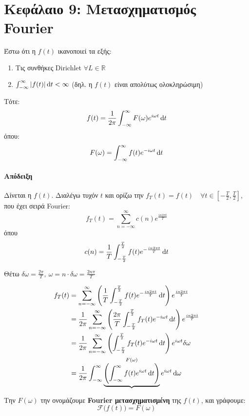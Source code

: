 \documentclass[11pt,a4paper,titlepage,draft]{article}
\begin{document}
\section{Κεφάλαιο 9: Μετασχηματισμός Fourier}
\begin{theorem*}{}
Έστω ότι η \(f(t)\) ικανοποιεί τα εξής:
\begin{enumerate}
\item Τις συνθήκες \textlatin{Dirichlet} \(\forall L \in  \mathbb R \)
\item \( \int_{-\infty}^\infty |f(t)| \dif t < \infty\) (δηλ. η \(f(t)\) είναι απολύτως ολοκληρώσιμη)
\end{enumerate}

Τότε:
\[
f(t) = \frac{1}{2\pi}
\int_{-\infty}^\infty F(\omega) e^{i\omega t} \dif t
\]
όπου:
\[
F(\omega) = \int_{-\infty}^\infty f(t)e^{-i\omega t} \dif t
\]

\end{theorem*}

\paragraph{Απόδειξη}
Δίνεται η \(f(t)\). Διαλέγω τυχόν \(t\) και ορίζω την \(f_T(t) = f(t)\quad \forall t \in \left[ -\frac{T}{2}, \frac{T}{2} \right]\), που έχει σειρά \textlatin{Fourier}:
\[
f_T(t) = \sum_{n=-\infty}^\infty c(n) e^\frac{in2\pi t}{T}
\]
όπου
\[
c(n) = \frac{1}{T} \int_{-\frac{T}{2}}^\frac{T}{2} f(t) e^{-\frac{in2\pi t}{T}} \dif t
\]

Θέτω \(\delta \omega = \frac{2\pi}{T},\ \omega = n\cdot \delta \omega = \frac{2n\pi}{T}
\)

\begin{align*}
f_T(t) &= \sum_{n=-\infty}^\infty
\left(
\frac{1}{T} \int_{-\frac{T}{2}}^\frac{T}{2} f(t) e^{-\frac{in2\pi t}{T}} \dif t
\right) e^\frac{in2\pi t}{T}
\\ &= \frac{1}{2\pi}
\sum_{n=-\infty}^\infty
\left(
\frac{2\pi}{T}
\int_{-\frac{T}{2}}^\frac{T}{2}
f_T(t)e^{-i\omega t} \dif t
\right) e^\frac{in2\pi t}{T}
\\ &=
\frac{1}{2\pi}
\sum_{n=-\infty}^\infty
\left(
\int_{-\frac{T}{2}}^\frac{T}{2}
f_T(t)e^{-i\omega t} \dif t
\right)
e^{i\omega t} \delta \omega
\\ &=
\frac{1}{2\pi}
\int_{-\infty}^\infty
\underbrace{\left(
\int_{-\infty}^\infty
f(t)e^{i\omega t} \dif t
\right)}^{F(\omega)}
e^{i\omega t}
\dif \omega
\end{align*}

Την \(F(\omega)\) την ονομάζουμε \textbf{\textlatin{Fourier} μετασχηματισμένη} της \(f(t)\), και γράφουμε:
\[
\mathscr{F}\bigg( f(t) \bigg) = F(\omega)
\]
\end{document}
